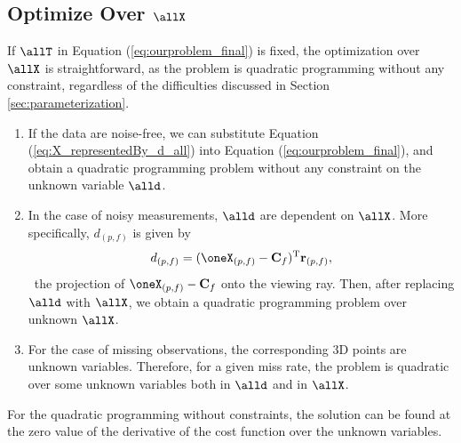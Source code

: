 \subsection{Optimize Over \texorpdfstring{$\allX$}{optimizeoverallX}} \label{sec:optimize_over_x}
If $\allT$ in Equation (\ref{eq:ourproblem_final}) is fixed, the optimization over $\allX$ is straightforward, as the problem is quadratic programming without any constraint, regardless of the difficulties discussed in Section \ref{sec:parameterization}.
\begin{enumerate}%
\item {If the data are noise-free,
we can substitute Equation (\ref{eq:X_representedBy_d_all}) into Equation (\ref{eq:ourproblem_final}),
and obtain a quadratic programming problem without any constraint on the unknown variable $\alld$. }
\item{
In the case of noisy measurements, $\alld$ are dependent on $\allX$. More specifically, $d_{(p,f)}$ is given by
\begin{equation}
d_{(p,f)}=(\oneX_{(p,f)}-\mathbf{C}_{f})^\text{T}\mathbf{r}_{(p,f)}, 
\end{equation}
\ie~the projection of $\oneX_{(p,f)}-\mathbf{C}_{f}$ onto the viewing ray. Then, after replacing $\alld$ with $\allX$, we obtain a quadratic programming problem over unknown $\allX$.
}
\item{ For the case of missing observations, the corresponding 3D points are unknown variables. Therefore, for a given miss rate, the problem is quadratic over some unknown variables both in $\alld$ and in $\allX$.
}
\end{enumerate}
For the quadratic programming without constraints, the solution can be found at the zero value of the derivative of the cost function over the unknown variables.

